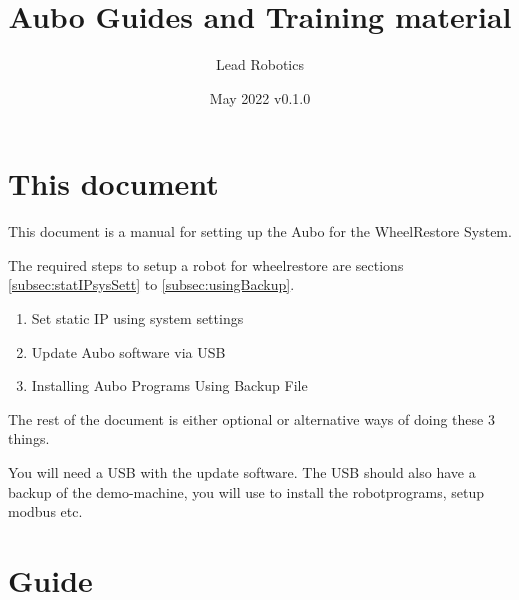 \documentclass{article}
\title{Aubo Guides and Training material}
\author{Lead Robotics}
\date{May 2022 v0.1.0}
\begin{document}
\maketitle

\tableofcontents

\section{This document}
This document is a manual for setting up the Aubo for the WheelRestore System. 

The required steps to setup a robot for wheelrestore are sections \ref{subsec:statIPsysSett} to \ref{subsec:usingBackup}. 
\begin{enumerate}
\item Set static IP using system settings
\item Update Aubo software via USB
\item Installing Aubo Programs Using Backup File
\end{enumerate}

The rest of the document is either optional or alternative ways of doing these 3 things. 

You will need a USB with the update software. The USB should also have a backup of the demo-machine, you will use to install the robotprograms, setup modbus etc.

\section{Guide}
\end{document}
